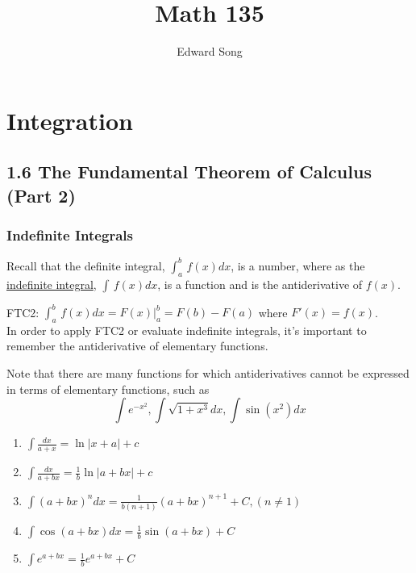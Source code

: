 \documentclass[11pt]{article}
\title{Math 135}
\author{Edward Song}
\theoremstyle{plain}
\theoremstyle{remark}
\theoremstyle{plain}
\begin{document}
\section{Integration}


   

\subsection*{1.6 The Fundamental Theorem of Calculus (Part 2)}

\subsubsection*{Indefinite Integrals}
Recall that the definite integral, $\int_a^b\,f(x)dx$, is a number, where as the \underline{indefinite integral}, $\int\,f(x)dx$, is a function
and is the antiderivative of $f(x)$.

\begin{tcolorbox}[colback=red!5!white,colframe=red!75!black,title=Definition: Recall]
   FTC2: $\int_a^b\,f(x)dx = F(x)|_a^b = F(b)-F(a)$ where $F'(x) = f(x)$. \\

   In order to apply FTC2 or evaluate indefinite integrals, it's important to remember the antiderivative of 
   elementary functions.
\end{tcolorbox}   

Note that there are many functions for which antiderivatives cannot be expressed in terms of elementary functions, such as
\[\int e^{-x^2}, \int \sqrt{1+x^3}dx, \int\sin(x^2)dx\]

\begin{tcolorbox}[colback=magenta!5!white,colframe=magenta!75!black,title=Problem 1 ]
    \begin{enumerate} [label=(\alph*)]
        \item $\int\frac{dx}{a+x} = \ln|x+a|+c$
        \item $\int\frac{dx}{a+bx} = \frac{1}{b}\ln|a+bx|+c$
        \item $\int(a+bx)^ndx = \frac{1}{b(n+1)}(a+bx)^{n+1}+C, (n\neq 1)$
        \item $\int\cos(a+bx)dx=\frac{1}{b}\sin(a+bx) +C$
        \item $\int e^{a+bx} = \frac{1}{b}e^{a+bx} +C$
    \end{enumerate}
\end{tcolorbox}   
\end{document}
